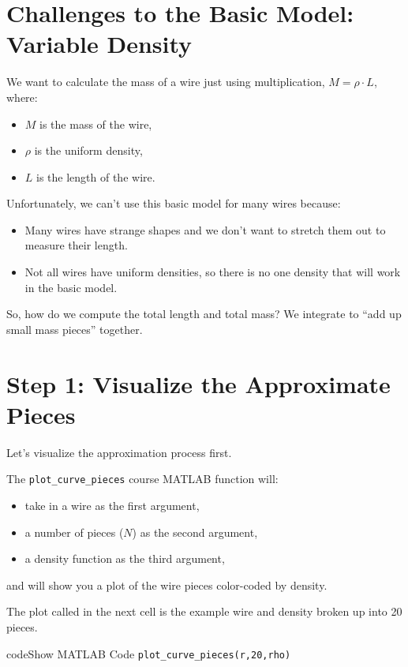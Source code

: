\documentclass{ximera}
\begin{document}
\section*{Challenges to the Basic Model: Variable Density}

We want to calculate the mass of a wire just using multiplication, $M = \rho \cdot L$, where:
\begin{itemize}
\item $M$ is the mass of the wire,
\item $\rho$ is the uniform density,
\item $L$ is the length of the wire.
\end{itemize}

Unfortunately, we can't use this basic model for many wires because:
\begin{itemize}
\item Many wires have strange shapes and we don't want to stretch them out to measure their length.
\item Not all wires have uniform densities, so there is no one density that will work in the basic model.
\end{itemize}

So, how do we compute the total length and total mass? We integrate to ``add up small mass pieces'' together.

\section*{Step 1: Visualize the Approximate Pieces}

Let's visualize the approximation process first. 

The \texttt{plot\_curve\_pieces} course MATLAB function will:
\begin{itemize}
\item take in a wire as the first argument,
\item a number of pieces ($N$) as the second argument,
\item a density function as the third argument,
\end{itemize}
and will show you a plot of the wire pieces color-coded by density.

\begin{remark}
The plot called in the next cell is the example wire and density broken up into 20 pieces.
\end{remark}

\begin{expandable}{code}{Show MATLAB Code}
\texttt{plot\_curve\_pieces(r,20,rho)}
\end{expandable}
\end{document}
